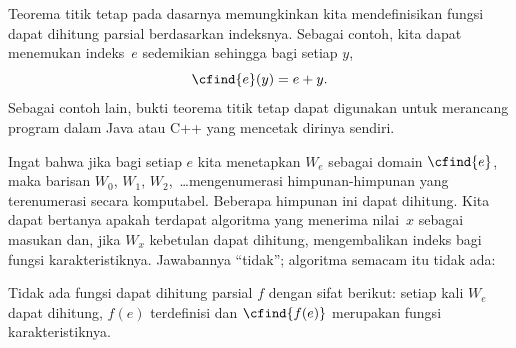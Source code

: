 \documentclass[../../../include/open-logic-section]{subfiles}
\begin{document}

Teorema titik tetap pada dasarnya memungkinkan kita mendefinisikan fungsi
dapat dihitung parsial berdasarkan indeksnya. Sebagai contoh, kita dapat
menemukan indeks~$e$ sedemikian sehingga bagi setiap $y$,
\[
\cfind{e}(y) = e+y.
\]
Sebagai contoh lain, bukti teorema titik tetap dapat digunakan untuk merancang
program dalam Java atau C++ yang mencetak dirinya sendiri.

Ingat bahwa jika bagi setiap $e$ kita menetapkan $W_e$ sebagai domain
$\cfind{e}$, maka barisan $W_0$, $W_1$, $W_2$,~\dots mengenumerasi
himpunan-himpunan yang terenumerasi secara komputabel. Beberapa himpunan ini
dapat dihitung. Kita dapat bertanya apakah terdapat algoritma yang menerima
nilai~$x$ sebagai masukan dan, jika $W_x$ kebetulan dapat dihitung,
mengembalikan indeks bagi fungsi karakteristiknya. Jawabannya ``tidak'';
algoritma semacam itu tidak ada:

\begin{thm}
Tidak ada fungsi dapat dihitung parsial $f$ dengan sifat berikut: setiap kali
$W_e$ dapat dihitung, $f(e)$ terdefinisi dan $\cfind{f(e)}$ merupakan fungsi
karakteristiknya.
\end{thm}
\end{document}
